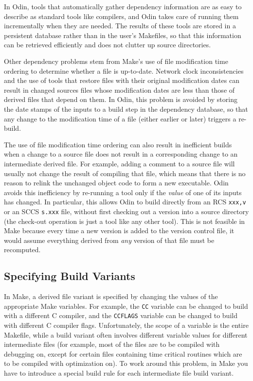 \documentclass[hidelinks]{report}
\newcommand{\ex}{\tt}   %
\begin{document}
In Odin, tools that automatically gather dependency information are
as easy to describe as standard tools like compilers,
and Odin takes care of running them incrementally when they are needed.
The results of these tools are stored in a persistent database
rather than in the user's Makefiles,
so that this information can be retrieved efficiently and does
not clutter up source directories.

Other dependency problems stem from Make's use of file modification time
ordering to determine whether a file is up-to-date.
Network clock inconsistencies and the use of tools
that restore files with their original modification dates
can result in changed sources files whose modification dates are less
than those of derived files that depend on them.
In Odin, this problem is avoided by storing 
the date stamps of the inputs to a build step in the dependency database,
so that any change to the modification time of a file (either earlier or later)
triggers a re-build.

The use of file modification time ordering
can also result in inefficient builds
when a change to a source file does not result in a corresponding change
to an intermediate derived file.
For example, adding a comment to a source file will usually not change
the result of compiling that file,
which means that there is no reason to relink the unchanged object code
to form a new executable.
Odin avoids this inefficiency by re-running a tool only if the
{\em value} of one of its inputs has changed.
In particular, this allows Odin to build directly from an RCS {\ex xxx,v}
or an SCCS {\ex s.xxx} file,
without first checking out a version into a source directory
(the check-out operation is just a tool like any other tool).
This is not feasible in Make because every time a new version is
added to the version control file,
it would assume everything derived from {\em any} version of that file
must be recomputed.

\subsection{Specifying Build Variants}

In Make, a derived file variant is specified by changing the values
of the appropriate Make variables.
For example, the {\ex CC} variable can be changed to build with
a different C compiler,
and the {\ex CCFLAGS} variable can be changed to build with different
C compiler flags.
Unfortunately, the scope of a variable is the entire Makefile,
while a build variant often involves different variable values
for different intermediate files (for example, most of the files are
to be compiled with debugging on, except for certain files containing
time critical routines which are to be compiled with optimization on).
To work around this problem, in Make you have to introduce a special build
rule for each intermediate file build variant.
\end{document}

